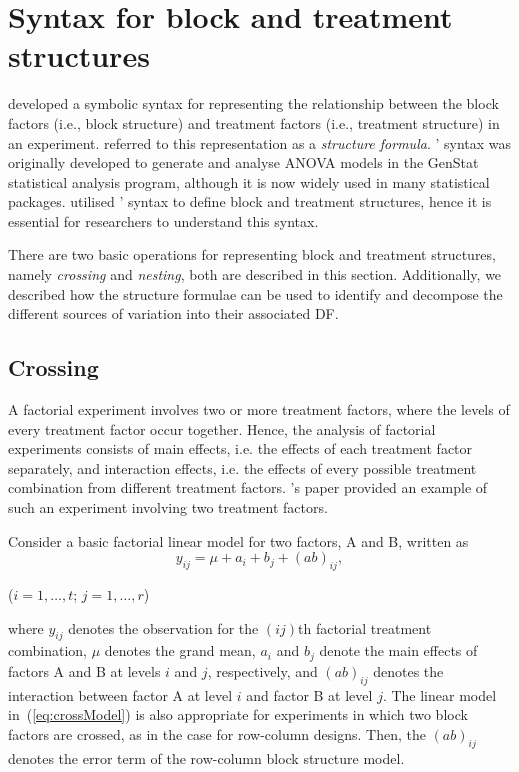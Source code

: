 \documentclass[article]{jss}
\begin{document}
\section{Syntax for block and treatment structures}\label{sec:tierStru}
\cite{Wilkinson1973} developed a symbolic syntax for representing the relationship between the block factors (i.e., block structure) and treatment factors (i.e., treatment structure) in an experiment. \cite{Brien1999} referred to this representation as a \emph{structure formula}. \citeauthor{Wilkinson1973}' syntax was originally developed to generate and analyse ANOVA models in the GenStat statistical analysis program, although it is now widely used in many statistical packages.  utilised \citeauthor{Wilkinson1973}' syntax to define block and treatment structures, hence it is essential for researchers to understand this syntax.

There are two basic operations for representing block and treatment structures, namely \emph{crossing} and \emph{nesting}, both are described in this section. Additionally, we described how the structure formulae can be used to identify and decompose the different sources of variation into their associated DF.

\subsection{Crossing}\label{subsec:cross}
A factorial experiment involves two or more treatment factors, where the levels of every treatment factor occur together. Hence, the analysis of factorial experiments consists of main effects, i.e. the effects of each treatment factor separately, and interaction effects, i.e. the effects of every possible treatment combination from different treatment factors. \citeauthor{Brien1999}'s paper provided an example of such an experiment involving two treatment factors.

Consider a basic factorial linear model for two factors, A and B, written as
\begin{equation}\label{eq:crossModel}
y_{ij}= \mu + a_{i} + b_{j} + (ab)_{ij},
\end{equation}
\begin{center}
($i=1,\dots ,t$; $j=1,\dots,r$)
\end{center}
where $y_{ij}$ denotes the observation for the $(ij)$th factorial treatment combination, $\mu$ denotes the grand mean, $a_{i}$ and $b_{j}$ denote the main effects of factors A and B at levels $i$ and $j$, respectively, and $(ab)_{ij}$ denotes the interaction between factor A at level $i$ and factor B at level $j$. The linear model in~(\ref{eq:crossModel}) is also appropriate for experiments in which two block factors are crossed, as in the case for row-column designs. Then, the $(ab)_{ij}$ denotes the error term of the row-column block structure model.
\end{document}
